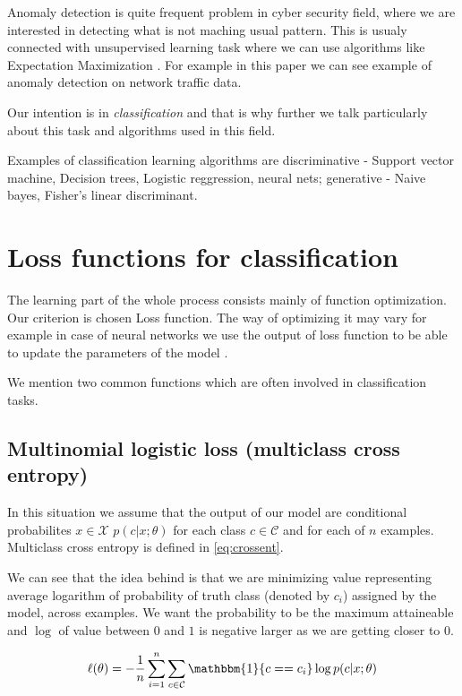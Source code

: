 Anomaly detection is quite frequent problem in cyber security field, where we are interested in detecting what is not maching usual pattern. This is usualy connected with unsupervised learning task where we can use algorithms like Expectation Maximization \cite{Dempster1977}. For example in this paper \cite{IglesiasVazquez2014} we can see example of anomaly detection on network traffic data.

Our intention is in \emph{classification} and that is why further we talk particularly about this task and algorithms used in this field.

Examples of classification learning algorithms are discriminative - Support vector machine, Decision trees, Logistic reggression, neural nets; generative - Naive bayes, Fisher's linear discriminant.


\section{Loss functions for classification}
The learning part of the whole process consists mainly of function optimization. Our criterion is chosen Loss function. The way of optimizing it may vary for example in case of neural networks we use the output of loss function to be able to update the parameters of the model \cite{JasonBrownlee2020}.

We mention two common functions which are often involved in classification tasks.

\subsection{Multinomial logistic loss (multiclass cross entropy)} 
In this situation we assume that the output of our model are conditional probabilites  $x \in \mathcal{X}$  $p(c|x;\theta)$ for each class $c \in \mathcal{C}$ and for each of $n$ examples.
Multiclass cross entropy is defined in \ref{eq:crossent}. 

We can see that the idea behind is that we are minimizing value representing average logarithm of probability of truth class (denoted by $c_i$) assigned by the model, across examples. We want the probability to be the maximum attaineable and $\log$ of value between $0$ and $1$ is negative larger as we are getting closer to $0$. 

\begin{equation} \label{eq:crossent}
    \ell(\theta)=-\frac{1}{n}\sum_{i=1}^{n}\sum_{c \in \mathcal{C}}\mathbbm{1}\{c==c_i\}\log p(c|x;\theta)
\end{equation}

